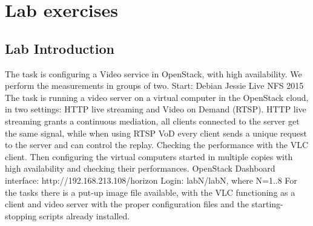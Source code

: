 \documentclass[a4paper]{article}
\begin{document}
\section{Lab exercises}

\subsection{Lab Introduction}

The task is configuring a Video service in OpenStack, with high availability. We perform the measurements in groups of
two. Start: Debian Jessie Live NFS 2015
The task is running a video server on a virtual computer in the OpenStack cloud, in two settings: HTTP live streaming
and Video on Demand (RTSP). HTTP live streaming grants a continuous mediation, all clients connected to the server get
the same signal, while when using RTSP VoD every client sends a unique request to the server and can control the
replay.
Checking the performance with the VLC client. Then configuring the virtual computers started in multiple copies with
high availability and checking their performances.
OpenStack Dashboard interface: http://192.168.213.108/horizon
Login: labN/labN, where N=1..8
For the tasks there is a put-up image file available, with the VLC functioning as a client and video server with the
proper configuration files and the starting-stopping scripts already installed.
\end{document}
